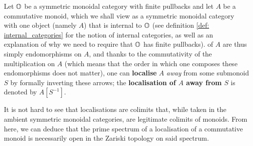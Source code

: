                 \begin{definition} \label{def: commutative_monoid_localisation}
                    Let $\mathbb{O}$ be a symmetric monoidal category with finite pullbacks and let $A$ be a commutative monoid, which we shall view as a symmetric monoidal category with one object (namely $A$) that is internal to $\mathbb{O}$ (see definition \ref{def: internal_categories} for the notion of internal categories, as well as an explanation of why we need to require that $\mathbb{O}$ has finite pullbacks).  of $A$ are thus simply endomorphisms on $A$, and thanks to the commutativity of the multiplication on $A$ (which means that the order in which one composes these endomorphisms does not matter), one can \textbf{localise} $A$ \textit{away} from some submonoid $S$ by formally inverting these arrows; the \textbf{localisation of $A$ away from $S$} is denoted by $A[S^{-1}]$. 
                \end{definition}
                \begin{remark} \label{remark: localisations_of_monoids_are_open}
                    It is not hard to see that localisations are colimits that, while taken in the ambient symmetric monoidal categories, are legitimate colimits of monoids. From here, we can deduce that the prime spectrum of a localisation of a commutative monoid is necessarily open in the Zariski topology on said spectrum.
                \end{remark}
                
